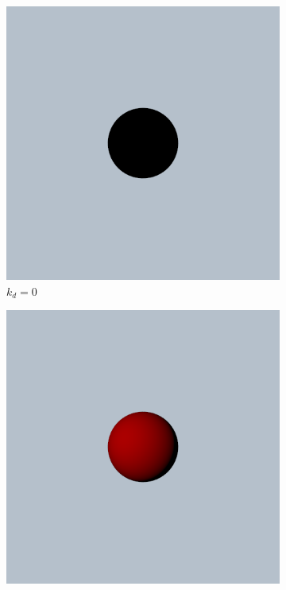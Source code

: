 \documentclass{article}
\begin{document}
\begin{figure}[h]
	\centering
	\begin{subfigure}{0.2\textwidth}
		\includegraphics[width=\textwidth]{diffuse_0}
		\caption{$k_{d} = 0$}
		\label{fig:diffuse_0.0}
	\end{subfigure}%
	\hfill
	\begin{subfigure}{0.2\textwidth}
		\includegraphics[width=\textwidth]{diffuse_0_3}

\end{subfigure}
\end{figure}
\end{document}

